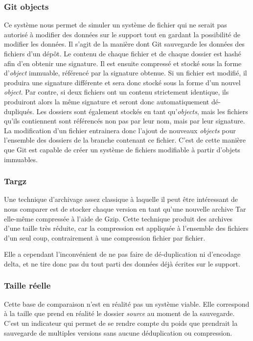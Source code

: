 \documentclass[a4paper]{article}
\begin{document}
\subsubsection{Git objects}

Ce système nous permet de simuler un système de fichier qui ne serait
pas autorisé à modifier des données sur le support tout en gardant la
possibilité de modifier les données. Il s'agit de la manière dont Git
sauvegarde les données des fichiers d'un dépôt. Le contenu de chaque
fichier et de chaque dossier est hashé afin d'en obtenir une signature.
Il est ensuite compressé et stocké sous la forme d'\emph{object}
immuable, référencé par la signature obtenue. Si un fichier est modifié,
il produira une signature différente et sera donc stocké sous la forme
d'un nouvel \emph{object}. Par contre, si deux fichiers ont un contenu
strictement identique, ils produiront alors la même signature et seront
donc automatiquement dé-dupliqués. Les dossiers sont également stockés
en tant qu'\emph{objects}, mais les fichiers qu'ils contiennent sont
référencés non pas par leur nom, mais par leur signature. La
modification d'un fichier entrainera donc l'ajout de nouveaux
\emph{objects} pour l'ensemble des dossiers de la branche contenant ce
fichier. C'est de cette manière que Git est capable de créer un système
de fichiers modifiable à partir d'objets immuables.

\subsubsection{Targz}

Une technique d'archivage assez classique à laquelle il peut être
intéressant de nous comparer est de stocker chaque version en tant
qu'une nouvelle archive Tar elle-même compressée à l'aide de Gzip. Cette
technique produit des archives d'une taille très réduite, car la
compression est appliquée à l'ensemble des fichiers d'un seul coup,
contrairement à une compression fichier par fichier.

Elle a cependant l'inconvénient de ne pas faire de dé-duplication ni
d'encodage delta, et ne tire donc pas du tout parti des données déjà
écrites sur le support.

\subsubsection{Taille réelle}

Cette base de comparaison n'est en réalité pas un système viable. Elle
correspond à la taille que prend en réalité le dossier \emph{source} au
moment de la sauvegarde. C'est un indicateur qui permet de se rendre
compte du poids que prendrait la sauvegarde de multiples versions sans
aucune déduplication ou compression.
\end{document}
